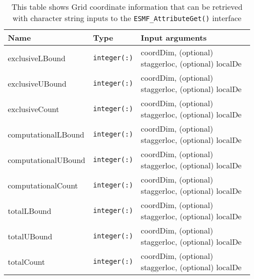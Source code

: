 \begin{table}[h!p!b!]
  \caption{This table shows Grid coordinate information that can be retrieved with character string inputs to the {\tt ESMF\_AttributeGet()} interface}
  \begin{tabular}{|l|l|l|}
    \hline
    {\bf Name} & {\bf Type} & {\bf Input arguments}\\
    \hline
    exclusiveLBound & {\tt integer(:)} & coordDim, (optional) staggerloc, (optional) localDe\\
    exclusiveUBound & {\tt integer(:)} & coordDim, (optional) staggerloc, (optional) localDe\\
    exclusiveCount & {\tt integer(:)} & coordDim, (optional) staggerloc, (optional) localDe\\
    computationalLBound & {\tt integer(:)} & coordDim, (optional) staggerloc, (optional) localDe\\
    computationalUBound & {\tt integer(:)} & coordDim, (optional) staggerloc, (optional) localDe\\
    computationalCount & {\tt integer(:)} & coordDim, (optional) staggerloc, (optional) localDe\\
    totalLBound & {\tt integer(:)} & coordDim, (optional) staggerloc, (optional) localDe\\
    totalUBound & {\tt integer(:)} & coordDim, (optional) staggerloc, (optional) localDe\\
    totalCount & {\tt integer(:)} & coordDim, (optional) staggerloc, (optional) localDe\\
    \hline
  \end{tabular}
  \label{AttributeInternalInfo-Coord}
\end{table}

